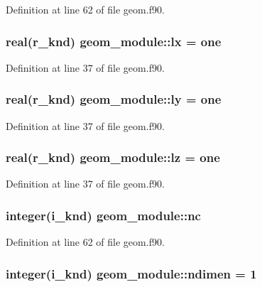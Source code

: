 Definition at line 62 of file geom.\-f90.

\hypertarget{classgeom__module_a1fe9e4dc8297fc98198b561000a97973}{
\subsubsection[{lx}]{\setlength{\rightskip}{0pt plus 5cm}real(r\-\_\-knd) geom\-\_\-module\-::lx = one}}\label{classgeom__module_a1fe9e4dc8297fc98198b561000a97973}


Definition at line 37 of file geom.\-f90.

\hypertarget{classgeom__module_adc5d5005b562bb94578c33b5bcde0012}{
\subsubsection[{ly}]{\setlength{\rightskip}{0pt plus 5cm}real(r\-\_\-knd) geom\-\_\-module\-::ly = one}}\label{classgeom__module_adc5d5005b562bb94578c33b5bcde0012}


Definition at line 37 of file geom.\-f90.

\hypertarget{classgeom__module_aba080d6dd2b57ad40676a7331daaa824}{
\subsubsection[{lz}]{\setlength{\rightskip}{0pt plus 5cm}real(r\-\_\-knd) geom\-\_\-module\-::lz = one}}\label{classgeom__module_aba080d6dd2b57ad40676a7331daaa824}


Definition at line 37 of file geom.\-f90.

\hypertarget{classgeom__module_af92dc09eacd9c240bd51ea2792a13820}{
\subsubsection[{nc}]{\setlength{\rightskip}{0pt plus 5cm}integer(i\-\_\-knd) geom\-\_\-module\-::nc}}\label{classgeom__module_af92dc09eacd9c240bd51ea2792a13820}


Definition at line 62 of file geom.\-f90.

\hypertarget{classgeom__module_a764bf4ab4dc187512c803d73505e6b57}{
\subsubsection[{ndimen}]{\setlength{\rightskip}{0pt plus 5cm}integer(i\-\_\-knd) geom\-\_\-module\-::ndimen = 1}}\label{classgeom__module_a764bf4ab4dc187512c803d73505e6b57}


